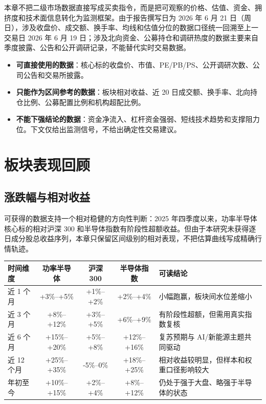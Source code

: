 
\color{black}

本章不把二级市场数据直接写成买卖指令，而是把可观察的价格、估值、资金、拥挤度和技术面信息转化为监测框架。由于报告撰写日为 2026 年 6 月 21 日（周日），涉及收盘价、成交额、换手率、均线和估值分位的数据口径统一回溯至上一交易日 2026 年 6 月 19 日；涉及北向资金、公募持仓和调研热度的数据主要来自季度披露、公告和公开调研记录，不能替代实时交易数据。

\begin{sourcequalitybox}[第九章数据质量说明]
\small
\begin{itemize}[leftmargin=1.5em, topsep=0pt, itemsep=0.2em]
\item \textbf{可直接使用的数据}：核心标的收盘价、市值、PE/PB/PS、公开调研次数、公司公告和交易所披露。
\item \textbf{只能作为区间参考的数据}：板块相对收益、近 20 日成交额、换手率、北向持仓比例、公募配置比例和机构超配比例。
\item \textbf{不能下强结论的数据}：资金净流入、杠杆资金强弱、短线技术趋势和支撑阻力位。下文仅给出监测信号，不给出确定性交易建议。
\end{itemize}
\end{sourcequalitybox}

\section{板块表现回顾}

\subsection{涨跌幅与相对收益}

可获得的数据支持一个相对稳健的方向性判断：2025 年四季度以来，功率半导体核心标的相对沪深 300 和半导体指数有阶段性超额收益。但由于本研究未获得逐日成分股总收益序列，本章只保留区间级别的相对表现，不把估算曲线写成精确行情轨迹。

\begin{exhibitbox}[表 9-1：功率半导体板块相对表现监测表]
\centering
\footnotesize
\begin{tabularx}{\exhibitboxwidth}{L{2.2cm} c c c X}
\toprule
\textbf{时间维度} & \textbf{功率半导体} & \textbf{沪深 300} & \textbf{半导体指数} & \textbf{可读结论} \\
\midrule
近 1 个月 & +3\%--+5\% & +1\%--+2\% & +2\%--+4\% & 小幅跑赢，板块间水位差缩小 \\
近 3 个月 & +8\%--+12\% & +3\%--+5\% & +6\%--+9\% & 有阶段性超额，但需用真实指数复核 \\
近 6 个月 & +15\%--+20\% & +5\%--+8\% & +12\%--+16\% & 复苏预期与 AI/新能源主题共同驱动 \\
近 12 个月 & +25\%--+35\% & -5\%--0\% & +18\%--+25\% & 相对收益较明显，但样本和权重口径影响较大 \\
年初至今 & +10\%--+15\% & +2\%--+4\% & +8\%--+12\% & 仍处于强于大盘、略强于半导体的状态 \\
\bottomrule
\end{tabularx}
\end{exhibitbox}


